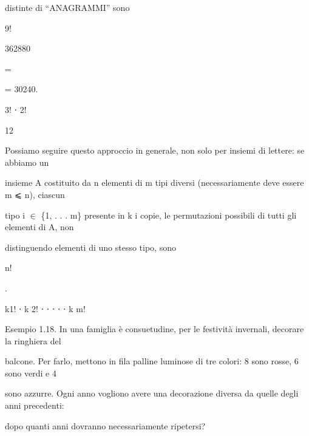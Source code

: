 \documentclass[a4paper,portrait,12pt]{article}
\begin{document}
\begin{flushleft}
distinte di ``ANAGRAMMI'' sono
\end{flushleft}


9!


362880


=


= 30240.


3! ⋅ 2!


12


\begin{flushleft}
Possiamo seguire questo approccio in generale, non solo per insiemi di lettere: se abbiamo un
\end{flushleft}


\begin{flushleft}
insieme A costituito da n elementi di m tipi diversi (necessariamente deve essere m ⩽ n), ciascun
\end{flushleft}


\begin{flushleft}
tipo i $\in$ \{1, . . . m\} presente in k i copie, le permutazioni possibili di tutti gli elementi di A, non
\end{flushleft}


\begin{flushleft}
distinguendo elementi di uno stesso tipo, sono
\end{flushleft}


\begin{flushleft}
n!
\end{flushleft}


.


\begin{flushleft}
k1! ⋅ k 2! ⋅ ⋅ ⋅ ⋅ ⋅ k m!
\end{flushleft}


\begin{flushleft}
Esempio 1.18. In una famiglia \`{e} consuetudine, per le festivit\`{a} invernali, decorare la ringhiera del
\end{flushleft}


\begin{flushleft}
balcone. Per farlo, mettono in fila palline luminose di tre colori: 8 sono rosse, 6 sono verdi e 4
\end{flushleft}


\begin{flushleft}
sono azzurre. Ogni anno vogliono avere una decorazione diversa da quelle degli anni precedenti:
\end{flushleft}


\begin{flushleft}
dopo quanti anni dovranno necessariamente ripetersi?
\end{flushleft}
\end{document}
